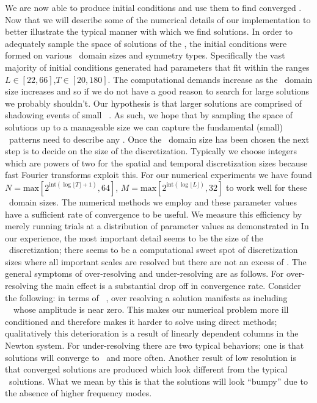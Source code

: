 We are now able to produce initial conditions and use them
to find converged \twots. Now that we will
describe some of the numerical details of our implementation
to better illustrate the typical manner with which we find solutions.
In order to adequately sample
the space of solutions of the \KSe, the
initial conditions were formed
on various \spt\ domain sizes and symmetry types. Specifically
the vast majority of initial conditions generated had parameters
that fit within the ranges $L \in [22,66]$,$T \in [20,180]$.
The computational demands increase as the \spt\ domain size increases
and so if we do not have a good reason to search for large solutions we
probably shouldn't. Our hypothesis is that larger solutions
are comprised of shadowing events of small \spt\ \twots.
As such, we hope that by sampling the space of solutions
up to a manageable size we can capture the fundamental (small)
\spt\ patterns need to describe any \twot.
Once the \spt\ domain size has been chosen the next step
is to decide on the size of the discretization. Typically we choose
integers which are powers of two for the spatial and temporal
discretization sizes because fast Fourier transforms
exploit this. For our
numerical experiments we have found
$N=\text{max}[2^{\text{int}(\log \lfloor T \rfloor+1)},64]$,
$M=\text{max}[2^{\text{int}(\log \lfloor L \rfloor)},32]$ to
work well for these \spt\ domain sizes.
The numerical methods we employ and these parameter values
have a sufficient rate of convergence to be useful. We measure
this efficiency by merely running trials at a distribution
of parameter values as demonstrated in
In our experience, the most important detail seems to be
the size of the \spt\ discretization; there seems to be
a computational sweet spot of discretization sizes where all
important scales are resolved but there are not an excess of
\Fcs.
The general symptoms
of over-resolving and under-resolving are as follows.
For over-resolving the main effect is
a substantial drop off in convergence rate. Consider
the following: in terms of \spt\ \Fcs, over resolving
a solution manifests as including \spt\ \Fcs\ whose
amplitude is near zero. This makes our numerical problem
more ill conditioned and therefore makes it harder to
solve using direct methods; qualitatively this
deterioration is a result of linearly dependent columns
in the Newton system.
For under-resolving there are two typical behaviors; one
is that solutions will converge to \eqva\ and \reqva more often.
Another
result of low resolution is that converged solutions are
produced which look different from the typical
\KSe\ solutions. What we mean by this is that the solutions
will look ``bumpy'' due to the absence of higher frequency modes.


